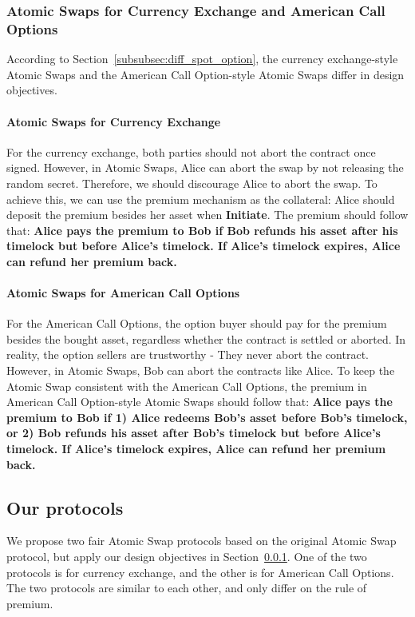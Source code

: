 \subsubsection{Atomic Swaps for Currency Exchange and American Call Options}
\label{subsubsec:design_obj}

According to Section~\ref{subsubsec:diff_spot_option}, the currency exchange-style Atomic Swaps and the American Call Option-style Atomic Swaps differ in design objectives.

\paragraph{Atomic Swaps for Currency Exchange}
For the currency exchange, both parties should not abort the contract once signed.
However, in Atomic Swaps, Alice can abort the swap by not releasing the random secret.
Therefore, we should discourage Alice to abort the swap.
To achieve this, we can use the premium mechanism as the collateral: Alice should deposit the premium besides her asset when \textbf{Initiate}.
The premium should follow that:
\textbf{Alice pays the premium to Bob if Bob refunds his asset after his timelock but before Alice's timelock.
If Alice's timelock expires, Alice can refund her premium back.}

\paragraph{Atomic Swaps for American Call Options}
For the American Call Options, the option buyer should pay for the premium besides the bought asset, regardless whether the contract is settled or aborted.
In reality, the option sellers are trustworthy - They never abort the contract.
However, in Atomic Swaps, Bob can abort the contracts like Alice.
To keep the Atomic Swap consistent with the American Call Options,
the premium in American Call Option-style Atomic Swaps should follow that: 
\textbf{Alice pays the premium to Bob if
1) Alice redeems Bob's asset before Bob's timelock, or
2) Bob refunds his asset after Bob's timelock but before Alice's timelock.
If Alice's timelock expires, Alice can refund her premium back.}











\subsection{Our protocols}
We propose two fair Atomic Swap protocols based on the original Atomic Swap protocol, but apply our design objectives in Section~\ref{subsubsec:design_obj}.
One of the two protocols is for currency exchange, and the other is for American Call Options.
The two protocols are similar to each other, and only differ on the rule of premium. 

